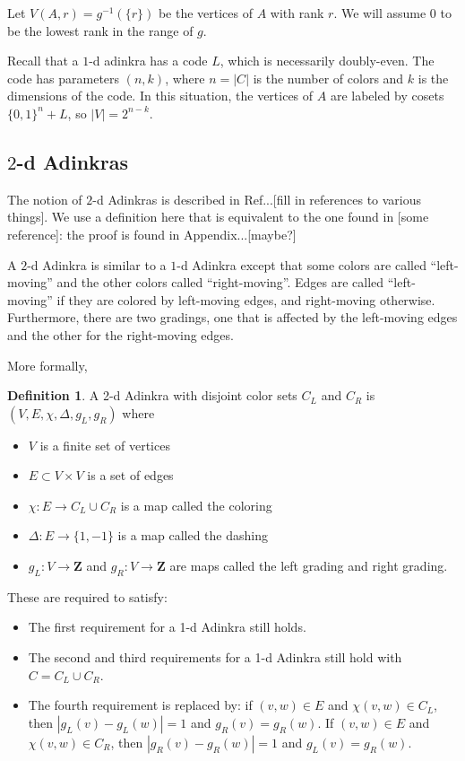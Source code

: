 \documentclass[12pt,twoside,singlespace]{article}
\numberwithin{equation}{section}
\theoremstyle{definition}
\newtheorem{definition}[equation]{Definition}
\newcommand{\ZZ}{\mathbf{Z}}
\begin{document}
Let $V(A, r)=g^{-1}(\{r\})$ be the vertices of $A$ with rank $r$.  We will assume $0$ to be the lowest rank in the range of $g$.

Recall that a $1$-d adinkra has a code $L$, which is necessarily doubly-even. The code has parameters $(n,k)$, where $n=|C|$ is the number of colors and $k$ is the dimensions of the code. In this situation, the vertices of $A$ are labeled by cosets $\{0,1\}^n + L$, so $|V| = 2^{n-k}$.

\subsection{$2$-d Adinkras}
The notion of $2$-d Adinkras is described in Ref...[fill in references to various things].  We use a definition here that is equivalent to the one found in [some reference]: the proof is found in Appendix...[maybe?]

A $2$-d Adinkra is similar to a $1$-d Adinkra except that some colors are called ``left-moving'' and the other colors called ``right-moving''.  Edges are called ``left-moving'' if they are colored by left-moving edges, and right-moving otherwise.  Furthermore, there are two gradings, one that is affected by the left-moving edges and the other for the right-moving edges.

More formally,
\begin{definition}
A 2-d Adinkra with disjoint color sets $C_L$ and $C_R$ is $(V,E,\chi,\Delta,g_L,g_R)$ where
\begin{itemize}
\item $V$ is a finite set of vertices
\item $E\subset V\times V$ is a set of edges
\item $\chi:E\to C_L\cup C_R$ is a map called the coloring
\item $\Delta:E\to \{1,-1\}$ is a map called the dashing
\item $g_L:V\to\ZZ$ and $g_R:V\to\ZZ$ are maps called the left grading and right grading.
\end{itemize}

These are required to satisfy:
\begin{itemize}
\item The first requirement for a 1-d Adinkra still holds.
\item The second and third requirements for a 1-d Adinkra still hold with $C=C_L\cup C_R$.
\item The fourth requirement is replaced by: if $(v,w)\in E$ and $\chi(v,w)\in C_L$, then $|g_L(v)-g_L(w)|=1$ and $g_R(v)=g_R(w)$.  If $(v,w)\in E$ and $\chi(v,w)\in C_R$, then $|g_R(v)-g_R(w)|=1$ and $g_L(v)=g_R(w)$.
\end{itemize}
\end{definition}
\end{document}
